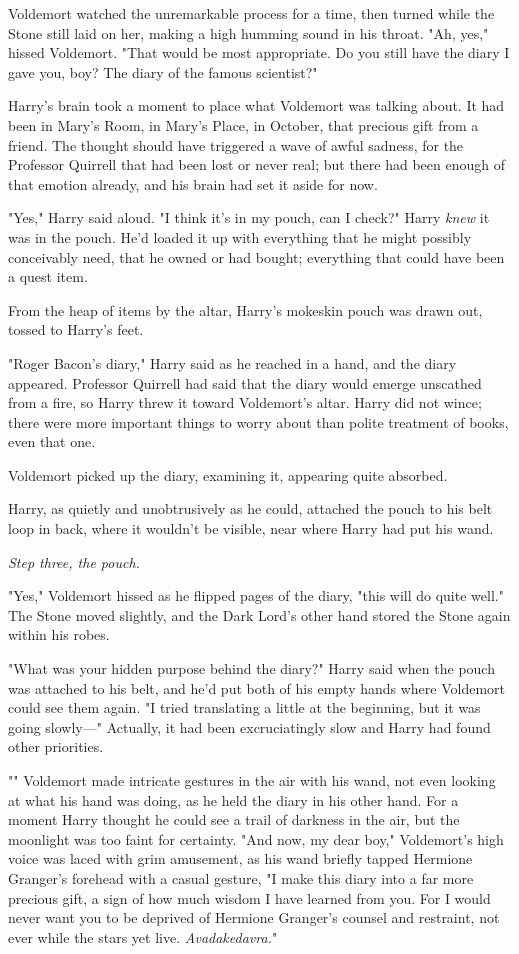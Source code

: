Voldemort watched the unremarkable process for a time, then turned while the
Stone still laid on her, making a high humming sound in his throat. "Ah, yes,"
hissed Voldemort. "That would be most appropriate. Do you still have the diary
I gave you, boy? The diary of the famous scientist?"

Harry's brain took a moment to place what Voldemort was talking about. It had
been in Mary's Room, in Mary's Place, in October, that precious gift from a
friend. The thought should have triggered a wave of awful sadness, for the
Professor Quirrell that had been lost or never real; but there had been enough
of that emotion already, and his brain had set it aside for now.

"Yes," Harry said aloud. "I think it's in my pouch, can I check?" Harry
\emph{knew} it was in the pouch. He'd loaded it up with everything that he
might possibly conceivably need, that he owned or had bought; everything that
could have been a quest item.

From the heap of items by the altar, Harry's mokeskin pouch was drawn out,
tossed to Harry's feet.

"Roger Bacon's diary," Harry said as he reached in a hand, and the diary
appeared. Professor Quirrell had said that the diary would emerge unscathed
from a fire, so Harry threw it toward Voldemort's altar. Harry did not wince;
there were more important things to worry about than polite treatment of books,
even that one.

Voldemort picked up the diary, examining it, appearing quite absorbed.

Harry, as quietly and unobtrusively as he could, attached the pouch to his belt
loop in back, where it wouldn't be visible, near where Harry had put his wand.

\emph{Step three, the pouch.}

"Yes," Voldemort hissed as he flipped pages of the diary, "this will do quite
well." The Stone moved slightly, and the Dark Lord's other hand stored the
Stone again within his robes.

"What was your hidden purpose behind the diary?" Harry said when the pouch was
attached to his belt, and he'd put both of his empty hands where Voldemort
could see them again. "I tried translating a little at the beginning, but it
was going slowly---" Actually, it had been excruciatingly slow and Harry had
found other priorities.

"" Voldemort made intricate gestures in the air with his wand, not even
looking at what his hand was doing, as he held the diary in his other hand. For
a moment Harry thought he could see a trail of darkness in the air, but the
moonlight was too faint for certainty. "And now, my dear boy," Voldemort's high
voice was laced with grim amusement, as his wand briefly tapped Hermione
Granger's forehead with a casual gesture, "I make this diary into a far more
precious gift, a sign of how much wisdom I have learned from you. For I would
never want you to be deprived of Hermione Granger's counsel and restraint, not
ever while the stars yet live. \emph{Avadakedavra.}"

